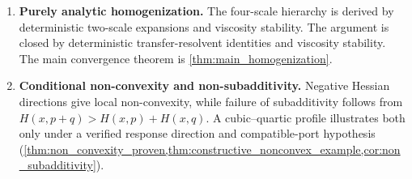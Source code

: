 \documentclass[12pt, letterpaper]{amsart}
\theoremstyle{plain}
\theoremstyle{definition}
\theoremstyle{remark}
\begin{document}
\begin{enumerate}[wide, labelindent=0pt]
    \item[\textbf{Section \ref{sec:scale_analysis}:}] \textbf{Purely analytic homogenization.}  The four-scale hierarchy is derived by deterministic two-scale expansions and viscosity stability.  The argument is closed by deterministic transfer-resolvent identities and viscosity stability.  The main convergence theorem is \cref{thm:main_homogenization}.

    \item[\textbf{Section \ref{sec:nonconvexity}:}] \textbf{Conditional non-convexity and non-subadditivity.} Negative Hessian directions give local non-convexity, while failure of subadditivity follows from $H(x,p+q)>H(x,p)+H(x,q)$. A cubic--quartic profile illustrates both only under a verified response direction and compatible-port hypothesis (\cref{thm:non_convexity_proven,thm:constructive_nonconvex_example,cor:non_subadditivity}).
\end{enumerate}
\end{document}
